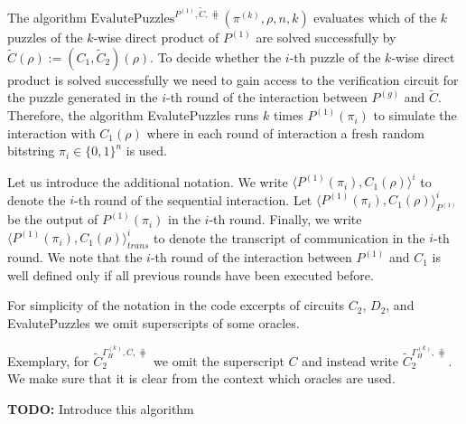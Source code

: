 %
The algorithm $\text{EvalutePuzzles}^{P^{(1)}, \widetilde{C}, \hash}(\pi^{(k)}, \rho, n, k)$
evaluates which of the $k$ puzzles of the $k$-wise direct product of $P^{(1)}$ are solved successfully by $\widetilde{C}(\rho) := (C_1,\widetilde{C}_2)(\rho)$.
To decide whether the $i$-th puzzle of the $k$-wise direct product is solved successfully we need to gain access to the verification circuit
for the puzzle generated in the $i$-th round of the interaction between $P^{(g)}$ and $\widetilde{C}$.
Therefore, the algorithm EvalutePuzzles runs $k$ times $P^{(1)}(\pi_i)$ to simulate the interaction with
$C_1(\rho)$ where in each round of interaction a fresh random bitstring $\pi_i \in \{0,1\}^{n}$ is used.

Let us introduce the additional notation.
We write $\langle P^{(1)}(\pi_i), C_1(\rho)\rangle^i$ to denote the $i$-th round of the sequential interaction.
Let $\langle P^{(1)}(\pi_i), C_1(\rho)\rangle^i_{P^{(1)}}$ be the output of $P^{(1)}(\pi_i)$ in the $i$-th round.
Finally, we write $\langle P^{(1)}(\pi_i), C_1(\rho)\rangle^i_{\mathit{trans}}$ to denote the transcript of communication in the $i$-th round.
We note that the $i$-th round of the interaction between $P^{(1)}$ and $C_1$ is well defined only if all previous rounds have been executed before.

For simplicity of the notation in the code excerpts of circuits $C_2$, $D_2$, and EvalutePuzzles we omit superscripts of some oracles.

Exemplary, for $\widetilde{C}_2^{\Gamma_H^{(k)}, C, \hash}$ we omit the superscript $C$ and instead write $\widetilde{C}_2^{\Gamma_H^{(k)}, \hash}$.
We make sure that it is clear from the context which oracles are used.

\begin{todo}
  \textbf{TODO:} Introduce this algorithm
\end{todo}

